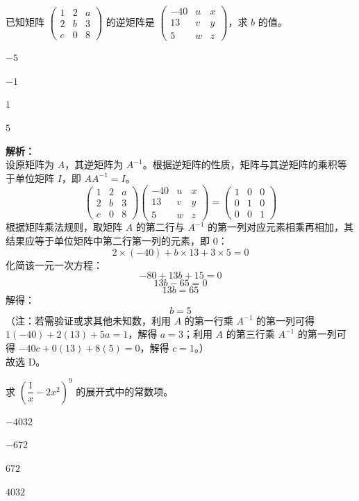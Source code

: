 \documentclass[12pt,a4paper]{exam-zh}
\begin{document}
\begin{question}
    已知矩阵 $\begin{pmatrix} 1 & 2 & a \\ 2 & b & 3 \\ c & 0 & 8 \end{pmatrix}$ 的逆矩阵是 $\begin{pmatrix} -40 & u & x \\ 13 & v & y \\ 5 & w & z \end{pmatrix}$，求 $b$ 的值。 \paren[D]
    \begin{choices}
        \item $-5$ \item $-1$ \item $1$ \item $5$
    \end{choices}
\end{question}

\begin{solution}
    \textbf{解析：} \\
    设原矩阵为 $A$，其逆矩阵为 $A^{-1}$。根据逆矩阵的性质，矩阵与其逆矩阵的乘积等于单位矩阵 $I$，即 $A A^{-1} = I$。
    \[ 
    \begin{pmatrix} 1 & 2 & a \\ 2 & b & 3 \\ c & 0 & 8 \end{pmatrix} \begin{pmatrix} -40 & u & x \\ 13 & v & y \\ 5 & w & z \end{pmatrix} = \begin{pmatrix} 1 & 0 & 0 \\ 0 & 1 & 0 \\ 0 & 0 & 1 \end{pmatrix} 
    \]
    根据矩阵乘法规则，取矩阵 $A$ 的第二行与 $A^{-1}$ 的第一列对应元素相乘再相加，其结果应等于单位矩阵中第二行第一列的元素，即 $0$：
    \[ 2 \times (-40) + b \times 13 + 3 \times 5 = 0 \]
    化简该一元一次方程：
    \[ -80 + 13b + 15 = 0 \]
    \[ 13b - 65 = 0 \]
    \[ 13b = 65 \]
    解得：
    \[ b = 5 \]
    （注：若需验证或求其他未知数，利用 $A$ 的第一行乘 $A^{-1}$ 的第一列可得 $1(-40)+2(13)+5a=1$，解得 $a=3$；利用 $A$ 的第三行乘 $A^{-1}$ 的第一列可得 $-40c+0(13)+8(5)=0$，解得 $c=1$。）\\
    故选 D。
\end{solution}

\begin{question}
    求 $(\dfrac{1}{x} - 2x^2)^9$ 的展开式中的常数项。\paren[B]
    \begin{choices}
        \item $-4032$ \item $-672$ \item $672$ \item $4032$
    \end{choices}
\end{question}
\end{document}
